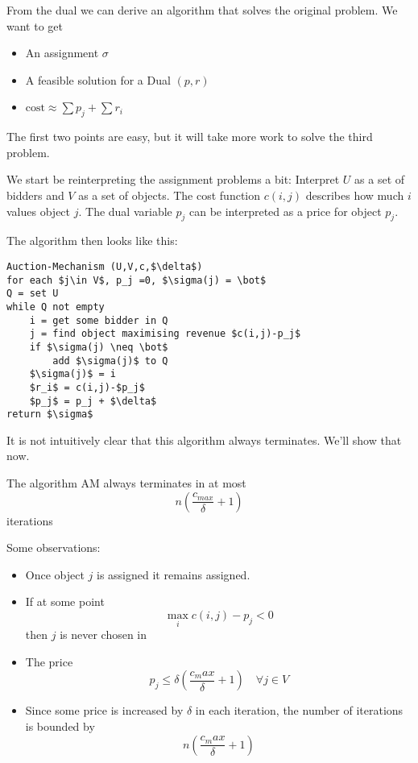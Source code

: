 From the dual we can derive an algorithm that solves the original problem. We want to get 

\begin{itemize}
\item An assignment $\sigma$
\item A feasible solution for a Dual $(p,r)$
\item $\text{cost} \approx \sum p_j + \sum r_i$
\end{itemize}

The first two points are easy, but it will take more work to solve the third problem.

We start be reinterpreting the assignment problems a bit: Interpret $U$ as a set of bidders and $V$ as a set of objects. The cost function $c(i,j)$ describes how much $i$ values object $j$. The dual variable $p_j$ can be interpreted as a price for object $p_j$.

The algorithm then looks like this:

\begin{lstlisting}
Auction-Mechanism (U,V,c,$\delta$)
for each $j\in V$, p_j =0, $\sigma(j) = \bot$
Q = set U
while Q not empty
	i = get some bidder in Q
	j = find object maximising revenue $c(i,j)-p_j$
	if $\sigma(j) \neq \bot$
		add $\sigma(j)$ to Q
	$\sigma(j)$ = i
	$r_i$ = c(i,j)-$p_j$
	$p_j$ = p_j + $\delta$
return $\sigma$
\end{lstlisting}



It is not intuitively clear that this algorithm always terminates. We'll show that now.

\begin{lem} The algorithm AM always terminates in at most 
\[n\left(\frac {c_{max}}{\delta} +1\right)\]
iterations
\end{lem}

Some observations:

\begin{itemize}
\item Once object $j$ is assigned it remains assigned. 
\item If at some point 
\[\max_i c(i,j) - p_j <0\]
then $j$ is never chosen in %
\item The price 
\[p_j\leq \delta \left( \frac{c_max}{\delta} +1\right) \quad \forall j\in V\] %
\item Since some price is increased by $\delta$ in each iteration, the number of iterations is bounded by
\[n\left(\frac {c_max}{\delta} +1\right)\]
\end{itemize}

